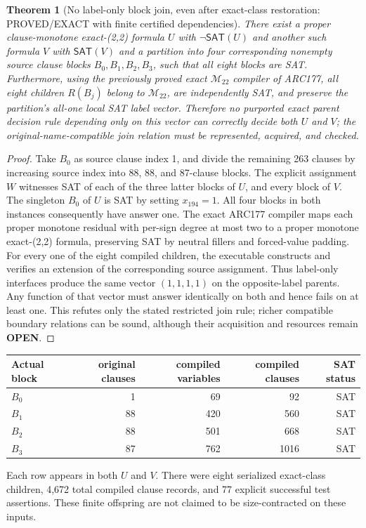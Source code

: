 \documentclass[11pt]{article}
\newtheorem{theorem}{Theorem}
\newcommand{\SAT}{\mathsf{SAT}}
\newcommand{\openstatus}{\textbf{OPEN}}
\begin{document}
\begin{theorem}[No label-only block join, even after exact-class restoration:
PROVED/EXACT with finite certified dependencies]
There exist a proper clause-monotone exact-(2,2) formula $U$ with
$\neg\SAT(U)$ and another such formula $V$ with $\SAT(V)$ and a
partition into four corresponding nonempty source clause blocks
$B_0,B_1,B_2,B_3$, such that \emph{all eight blocks are SAT}. Furthermore,
using the previously proved exact $\mathcal M_{22}$ compiler of
ARC177, all eight children $R(B_j)$ belong to $\mathcal M_{22}$,
are independently SAT, and preserve the partition's all-one
local SAT label vector. Therefore no purported exact parent decision
rule depending \emph{only} on this vector can correctly decide both
$U$ and $V$; the original-name-compatible join relation must be
represented, acquired, and checked.
\end{theorem}
\begin{proof}
Take $B_0$ as source clause index 1, and divide the remaining
263 clauses by increasing source index into 88, 88, and 87-clause
blocks. The explicit assignment $W$ witnesses SAT of each of the
three latter blocks of $U$, and every block of $V$.
The singleton $B_0$ of $U$ is SAT by setting $x_{194}=1$.
All four blocks in both instances consequently have answer one.
The exact ARC177 compiler maps each proper monotone residual with
per-sign degree at most two to a proper monotone exact-(2,2)
formula, preserving SAT by neutral fillers and forced-value padding.
For every one of the eight compiled children, the executable
constructs and verifies an extension of the corresponding source
assignment. Thus label-only interfaces produce the same vector
$(1,1,1,1)$ on the opposite-label parents. Any function of that
vector must answer identically on both and hence fails on at least one.
This refutes only the stated restricted join rule; richer compatible
boundary relations can be sound, although their acquisition and
resources remain \openstatus.
\end{proof}

\begin{center}
\begin{tabular}{lrrrr}
\toprule
Actual block&original clauses&compiled variables&compiled clauses&SAT status\\
\midrule
$B_0$&1&69&92&SAT\\
$B_1$&88&420&560&SAT\\
$B_2$&88&501&668&SAT\\
$B_3$&87&762&1016&SAT\\
\bottomrule
\end{tabular}
\end{center}
Each row appears in both $U$ and $V$. There were eight serialized
exact-class children, 4,672 total compiled clause records, and
77 explicit successful test assertions. These finite offspring are
not claimed to be size-contracted on these inputs.
\end{document}
